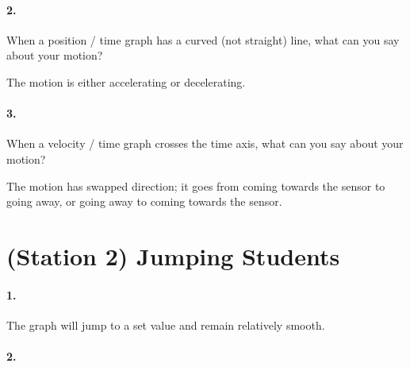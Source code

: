     \paragraph*{2.} When a position / time graph has a curved (not straight) line, what can you say about your motion?
    
    \begin{mdframed}
        The motion is either accelerating or decelerating.
    \end{mdframed}
    
    \paragraph*{3.} When a velocity / time graph crosses the time axis, what can you say about your motion?

    \begin{mdframed}
        The motion has swapped direction; it goes from coming towards the sensor to going away, or going away to coming towards the sensor.
    \end{mdframed}

    \pagebreak

    \section*{(Station 2) Jumping Students}
        \paragraph*{1.}

        \begin{mdframed}
            The graph will jump to a set value and remain relatively smooth.

        \end{mdframed}

        \paragraph*{2.}

